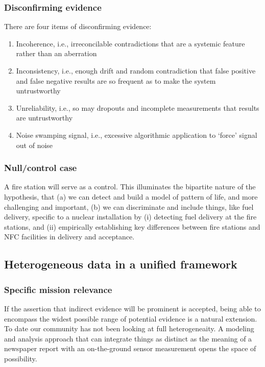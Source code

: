 \documentclass{article} %
\begin{document}
\subsubsection{Disconfirming evidence}
There are four items of disconfirming evidence:
\begin{enumerate}
\item Incoherence, i.e., irreconcilable contradictions that are a systemic feature rather than an aberration
\item Inconsistency, i.e., enough drift and random contradiction that false positive and false negative results are so frequent as to make the system untrustworthy
\item Unreliability, i.e., so may dropouts and incomplete measurements that results are untrustworthy
\item Noise swamping signal, i.e., excessive algorithmic application to `force' signal out of noise
\end{enumerate}

\subsubsection{Null/control case}
A fire station will serve as a control. This illuminates the bipartite nature of the hypothesis, that (a) we can detect and build a model of pattern of life, and more challenging and important, (b) we can discriminate and include things, like fuel delivery, specific to a nuclear installation by (i) detecting fuel delivery at the fire stations, and (ii) empirically establishing key differences between fire stations and NFC facilities in delivery and acceptance.

\pagebreak
\subsection{Heterogeneous data in a unified framework}
\subsubsection{Specific mission relevance}
If the assertion that indirect evidence will be prominent is accepted, being able to encompass the widest possible range of potential evidence is a natural extension. To date our community has not been looking at full heterogeneaity. A modeling and analysis approach that can integrate things as distinct as the meaning of a newspaper report with an on-the-ground sensor measurement opens the space of possibility.
\end{document}
